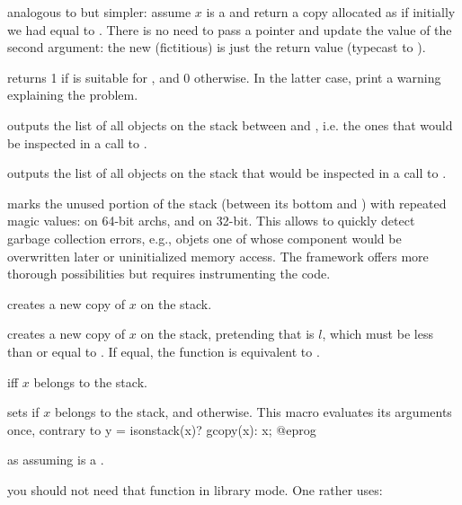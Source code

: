  analogous to  but
simpler: assume $x$ is a  and return a copy allocated as if
initially we had  equal to . There is no need to pass a
pointer and update the value of the second argument: the new (fictitious)
 is just the return value (typecast to ).


 returns 1 if  is suitable for
, and 0 otherwise. In the latter case, print a warning
explaining the problem.

 outputs the list of all objects on the
stack between  and , i.e. the ones that would be inspected
in a call to .

 outputs the list of all objects on the
stack that would be inspected in a call to .

 marks the unused portion of the stack
(between its bottom and ) with repeated magic values:
 on 64-bit archs, and  on 32-bit.
This allows to quickly detect garbage collection errors, e.g., objets one of
whose component would be overwritten later or uninitialized memory access.
The  framework offers more thorough possibilities but requires
instrumenting the code.


 creates a new copy of $x$ on the stack.

 creates a new copy of $x$
on the stack, pretending that  is $l$, which must be less than or
equal to . If equal, the function is equivalent to .

  iff $x$ belongs to the stack.

 sets  if
$x$ belongs to the stack, and  otherwise. This macro evaluates
its arguments once, contrary to
\bprog
  y = isonstack(x)? gcopy(x): x;
@eprog

 as  assuming 
is a .


 you should not need that function in library mode.
One rather uses:


